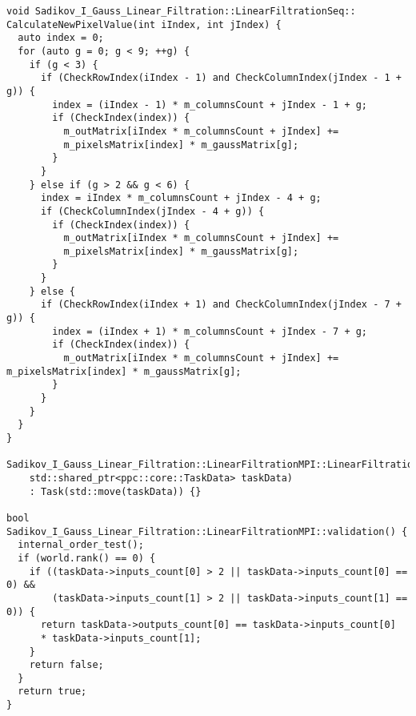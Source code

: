 \documentclass[14pt]{article}
\begin{document}
\begin{verbatim}
void Sadikov_I_Gauss_Linear_Filtration::LinearFiltrationSeq::
CalculateNewPixelValue(int iIndex, int jIndex) {
  auto index = 0;
  for (auto g = 0; g < 9; ++g) {
    if (g < 3) {
      if (CheckRowIndex(iIndex - 1) and CheckColumnIndex(jIndex - 1 + g)) {
        index = (iIndex - 1) * m_columnsCount + jIndex - 1 + g;
        if (CheckIndex(index)) {
          m_outMatrix[iIndex * m_columnsCount + jIndex] += 
          m_pixelsMatrix[index] * m_gaussMatrix[g];
        }
      }
    } else if (g > 2 && g < 6) {
      index = iIndex * m_columnsCount + jIndex - 4 + g;
      if (CheckColumnIndex(jIndex - 4 + g)) {
        if (CheckIndex(index)) {
          m_outMatrix[iIndex * m_columnsCount + jIndex] += 
          m_pixelsMatrix[index] * m_gaussMatrix[g];
        }
      }
    } else {
      if (CheckRowIndex(iIndex + 1) and CheckColumnIndex(jIndex - 7 + g)) {
        index = (iIndex + 1) * m_columnsCount + jIndex - 7 + g;
        if (CheckIndex(index)) {
          m_outMatrix[iIndex * m_columnsCount + jIndex] += m_pixelsMatrix[index] * m_gaussMatrix[g];
        }
      }
    }
  }
}

Sadikov_I_Gauss_Linear_Filtration::LinearFiltrationMPI::LinearFiltrationMPI(
    std::shared_ptr<ppc::core::TaskData> taskData)
    : Task(std::move(taskData)) {}

bool Sadikov_I_Gauss_Linear_Filtration::LinearFiltrationMPI::validation() {
  internal_order_test();
  if (world.rank() == 0) {
    if ((taskData->inputs_count[0] > 2 || taskData->inputs_count[0] == 0) &&
        (taskData->inputs_count[1] > 2 || taskData->inputs_count[1] == 0)) {
      return taskData->outputs_count[0] == taskData->inputs_count[0] 
      * taskData->inputs_count[1];
    }
    return false;
  }
  return true;
}


\end{verbatim}
\end{document}

